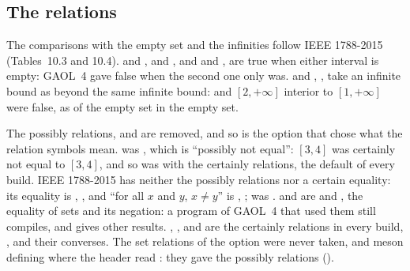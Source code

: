 \subsection{The relations}
\label{sec:changes-relations}
%

The comparisons with the empty set and the infinities follow IEEE 1788-2015
(Tables~10.3 and 10.4).\newinvfive{}  and
,  and , and
 and , are true when either
interval is empty: GAOL~4 gave false when the second one only was.
 and , , take
an infinite bound as beyond the same infinite bound:
 and $[2, +\infty]$ interior to $[1, +\infty]$
were false, as  of the empty set in the empty set.

\medskip
The possibly relations,  and 
are removed, and so is the option that chose what the relation symbols
mean.\newinvfive{}  was
, which is ``possibly not equal'': $[3, 4]$ was
certainly not equal to $[3, 4]$, and so was \code{!=} with the certainly
relations, the default of every build. IEEE 1788-2015 has neither the
possibly relations nor a certain equality: its equality is ,
, and ``for all $x$ and $y$, $x \neq y$'' is
, ;  was
. \code{==} and \code{!=} are  and
, the equality of sets and its negation: a program of
GAOL~4 that used them still compiles, and gives other results.
\code{<}, \code{<=}, \code{>} and \code{>=} are
the certainly relations in every build, ,
 and their converses. The set relations of the option were
never taken,  and meson defining 
where the header read : they gave the possibly
relations ().

